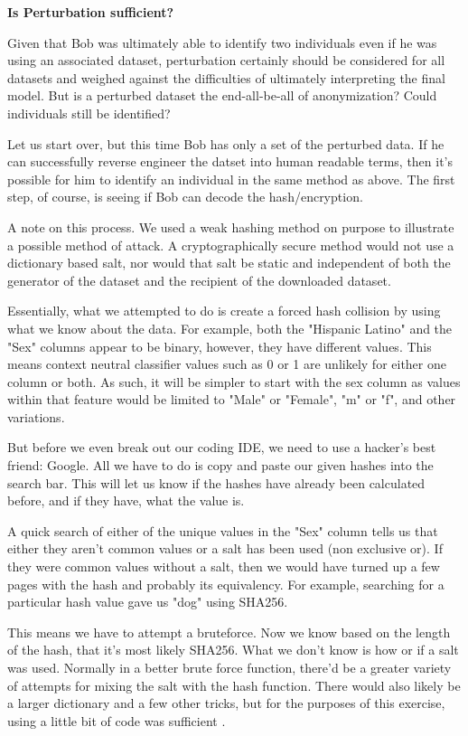 \documentclass[10pt,journal,compsoc]{IEEEtran}
\begin{document}
\noindent \textbf{Is Perturbation sufficient?}

Given that Bob was ultimately able to identify two individuals even if he was using an associated dataset, perturbation certainly should be considered for all datasets and weighed against the difficulties of ultimately interpreting the final model. But is a perturbed dataset the end-all-be-all of anonymization? Could individuals still be identified?

Let us start over, but this time Bob has only a set of the perturbed data. If he can successfully reverse engineer the datset into human readable terms, then it's possible for him to identify an individual in the same method as above.
The first step, of course, is seeing if Bob can decode the hash/encryption.

A note on this process. We used a weak hashing method on purpose to illustrate a possible method of attack. A cryptographically secure method would not use a dictionary based salt, nor would that salt be static and independent of both the generator of the dataset and the recipient of the downloaded dataset.

Essentially, what we attempted to do is create a forced hash collision by using what we know about the data. For example, both the "Hispanic Latino" and the "Sex" columns appear to be binary, however, they have different values. This means context neutral classifier values such as 0 or 1 are unlikely for either one column or both. As such, it will be simpler to start with the sex column as values within that feature would be limited to "Male" or "Female", "m" or "f", and other variations.

But before we even break out our coding IDE, we need to use a hacker's best friend: Google. All we have to do is copy and paste our given hashes into the search bar. This will let us know if the hashes have already been calculated before, and if they have, what the value is.

A quick search of either of the unique values in the "Sex" column tells us that either they aren't common values or a salt has been used (non exclusive or). If they were common values without a salt, then we would have turned up a few pages with the hash and probably its equivalency. For example, searching for a particular hash value gave us "dog" using SHA256.

This means we have to attempt a bruteforce. Now we know based on the length of the hash, that it's most likely SHA256. What we don't know is how or if a salt was used. Normally in a better brute force function, there'd be a greater variety of attempts for mixing the salt with the hash function. There would also likely be a larger dictionary and a few other tricks, but for the purposes of this exercise, using a little bit of code was sufficient \cite{frye}.
\end{document}
